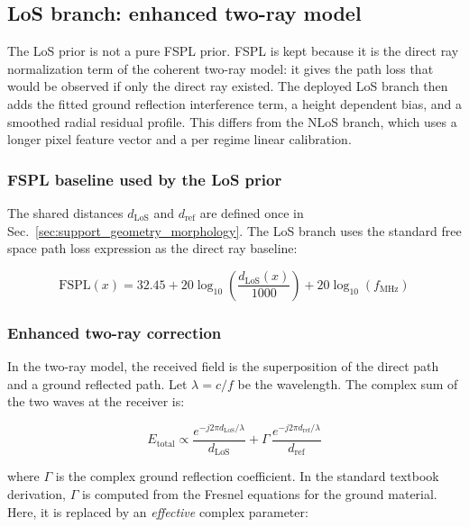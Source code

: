 \subsection{LoS branch: enhanced two-ray model}

The LoS prior is not a pure FSPL prior. FSPL is kept because it is the
direct ray normalization term of the coherent two-ray model: it gives the
path loss that would be observed if only the direct ray existed. The deployed
LoS branch then adds the fitted ground reflection interference term,
a height dependent bias, and a smoothed radial residual profile. This differs
from the NLoS branch, which uses a longer pixel feature vector and a
per regime linear calibration.

\subsubsection{FSPL baseline used by the LoS prior}

The shared distances \(d_{\mathrm{LoS}}\) and \(d_{\mathrm{ref}}\) are defined
once in Sec.~\ref{sec:support_geometry_morphology}. The LoS branch uses the
standard free space path loss expression as the direct ray baseline:

\begin{equation}
\mathrm{FSPL}(x)
=
32.45
+ 20 \log_{10}\!\left(\frac{d_{\mathrm{LoS}}(x)}{1000}\right)
+ 20 \log_{10}(f_{\mathrm{MHz}})
\label{eq:fspl}
\end{equation}

\subsubsection{Enhanced two-ray correction}

In the two-ray model, the received field is the superposition of the direct
path and a ground reflected path. Let \(\lambda=c/f\) be the wavelength. The
complex sum of the two waves at the receiver is:

\begin{equation}
E_{\mathrm{total}}
\propto
\frac{e^{-j2\pi d_{\mathrm{LoS}}/\lambda}}{d_{\mathrm{LoS}}}
+
\Gamma\,\frac{e^{-j2\pi d_{\mathrm{ref}}/\lambda}}{d_{\mathrm{ref}}}
\label{eq:field_sum}
\end{equation}

where $\Gamma$ is the complex ground reflection coefficient. In the standard
textbook derivation, $\Gamma$ is computed from the Fresnel equations for the
ground material. Here, it is replaced by an \emph{effective} complex
parameter:

